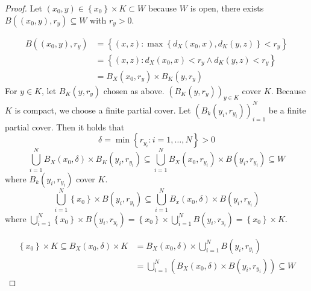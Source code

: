 \documentclass[a4paper,landscape,twocolumn]{article}
\theoremstyle{definition}
\newcommand\set[1]{\left\{#1\right\}}
\begin{document}
\begin{proof}
  Let $(x_0, y) \in \set{x_0} \times K \subset W$ because $W$ is open,
  there exists $B((x_0, y), r_y) \subseteq W$ with $r_y > 0$.

  \begin{align*}
    B((x_0, y), r_y) &= \set{(x,z): \max\set{d_X(x_0, x), d_K(y,z)} < r_y} \\
    &= \set{(x,z): d_X(x_0,x) < r_y \land d_K(y,z) < r_y} \\
    &= B_X(x_0, r_y) \times B_K(y, r_y)
  \end{align*}
  For $y \in K$, let $B_K(y, r_y)$ chosen as above. $\left(B_K(y, r_y)\right)_{y \in K}$ cover $K$.
  Because $K$ is compact, we choose a finite partial cover.
  Let $(B_k(y_i, r_{y_i}))_{i=1}^N$ be a finite partial cover.
  Then it holds that
  \[ \delta = \min\set{r_{y_i}: i = 1, \ldots, N} > 0 \]
  \[ \bigcup_{i=1}^N B_X(x_0, \delta) \times B_K(y_i, r_{y_i}) \subseteq \bigcup_{i=1}^N B_X(x_0, r_{y_i}) \times B(y_i, r_{y_i}) \subseteq W \]
  where $B_k(y_i, r_{y_i})$ cover $K$.
  \[ \bigcup_{i=1}^N \set{x_0} \times B(y_i, r_{y_i}) \subseteq \bigcup_{i=1}^N B_x(x_0, \delta) \times B(y_i, r_{y_i}) \]
  where $\bigcup_{i=1}^N \set{x_0} \times B(y_i, r_{y_i}) = \set{x_0} \times \bigcup_{i=1}^N B(y_i, r_{y_i}) = \set{x_0} \times K$.

  \begin{align*}
    \set{x_0} \times K \subseteq B_X(x_0, \delta) \times K
    &= B_X(x_0, \delta) \times \bigcup_{i=1}^N B(y_i, r_{y_i}) \\
    &= \bigcup_{i=1}^N \left(B_X(x_0, \delta) \times B(y_i, r_{y_i})\right) \subseteq W
  \end{align*}
\end{proof}
\end{document}
